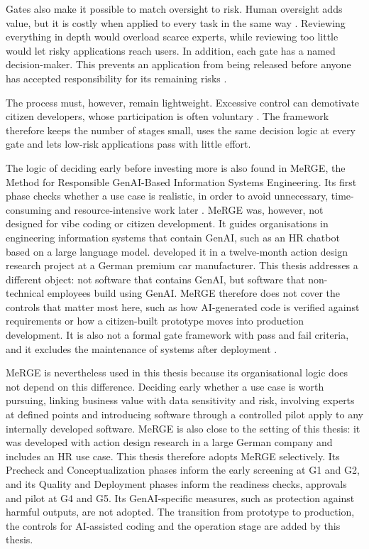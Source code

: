 \documentclass[10pt,a4paper]{article}
\begin{document}
Gates also make it possible to match oversight to risk. Human oversight adds value, but it is costly when applied to every task in the same way \parencite{kang2026}. Reviewing everything in depth would overload scarce experts, while reviewing too little would let risky applications reach users. In addition, each gate has a named decision-maker. This prevents an application from being released before anyone has accepted responsibility for its remaining risks \parencite{wangliu2026}.

The process must, however, remain lightweight. Excessive control can demotivate citizen developers, whose participation is often voluntary \parencite{viljoen2024}. The framework therefore keeps the number of stages small, uses the same decision logic at every gate and lets low-risk applications pass with little effort.

The logic of deciding early before investing more is also found in MeRGE, the Method for Responsible GenAI-Based Information Systems Engineering. Its first phase checks whether a use case is realistic, in order to avoid unnecessary, time-consuming and resource-intensive work later \parencite{fetzer2026}. MeRGE was, however, not designed for vibe coding or citizen development. It guides organisations in engineering information systems that contain GenAI, such as an HR chatbot based on a large language model. \textcite{fetzer2026} developed it in a twelve-month action design research project at a German premium car manufacturer. This thesis addresses a different object: not software that contains GenAI, but software that non-technical employees build using GenAI. MeRGE therefore does not cover the controls that matter most here, such as how AI-generated code is verified against requirements or how a citizen-built prototype moves into production development. It is also not a formal gate framework with pass and fail criteria, and it excludes the maintenance of systems after deployment \parencite{fetzer2026}.

MeRGE is nevertheless used in this thesis because its organisational logic does not depend on this difference. Deciding early whether a use case is worth pursuing, linking business value with data sensitivity and risk, involving experts at defined points and introducing software through a controlled pilot apply to any internally developed software. MeRGE is also close to the setting of this thesis: it was developed with action design research in a large German company and includes an HR use case. This thesis therefore adopts MeRGE selectively. Its Precheck and Conceptualization phases inform the early screening at G1 and G2, and its Quality and Deployment phases inform the readiness checks, approvals and pilot at G4 and G5. Its GenAI-specific measures, such as protection against harmful outputs, are not adopted. The transition from prototype to production, the controls for AI-assisted coding and the operation stage are added by this thesis.
\end{document}
